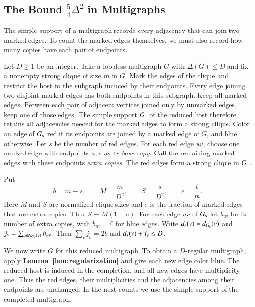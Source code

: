 

\subsection{The Bound \texorpdfstring{$\frac{5}{4}\Delta^2$}{5 Delta squared / 4} in Multigraphs}
\label{sec:multigraph}\label{sec:weighted-counts}

The simple support of a multigraph records every adjacency that can
join two marked edges. To count the marked edges themselves, we must
also record how many copies have each pair of endpoints.

Let $D\geq1$ be an integer. Take a loopless multigraph $G$ with
$\Delta(G)\leq D$ and fix a
nonempty strong clique of size $m$ in $G$. Mark the edges of the clique
and restrict the host to the subgraph induced by their endpoints.
Every edge joining two disjoint marked edges has both endpoints in this
subgraph. Keep all marked edges. Between each pair of adjacent vertices joined
only by unmarked edges, keep one of those edges. The simple support $G_{\rm s}$ of the reduced
host therefore retains all adjacencies needed for the marked edges to
form a strong clique. Color an edge of $G_{\rm s}$ red if its endpoints are joined by a
marked edge of $G$, and blue otherwise. Let $s$ be the number of red
edges. For each red edge $uv$, choose one marked edge with endpoints
$u,v$ as its \emph{base copy}. Call the remaining marked edges with
these endpoints \emph{extra copies}. The red edges form a strong
clique in $G_{\rm s}$.

Put
\[
 b=m-s,\qquad M=\frac{m}{D^2},\qquad S=\frac{s}{D^2},
 \qquad e=\frac{b}{m}.
\]
Here $M$ and $S$ are normalized clique sizes and $e$ is the fraction
of marked edges that are extra copies. Thus $S=M(1-e)$. For each edge $uv$ of $G_{\rm s}$ let $b_{uv}$ be its
number of extra copies, with $b_{uv}=0$ for blue edges. Write
$d_{\rm s}(v)=d_{G_{\rm s}}(v)$ and
$j_v=\sum_{u\in N_{G_{\rm s}}(v)}b_{uv}$.
Then $\sum_v j_v=2b$ and $d_{\rm s}(v)+j_v\le D$.

We now write $G$ for this reduced multigraph. To obtain a
$D$-regular multigraph, apply \textbf{Lemma~\ref{lem:regularization}} and give each new edge
color blue. The reduced host is induced in the completion, and all
new edges have multiplicity one. Thus the red edges, their
multiplicities and the adjacencies among their endpoints are
unchanged. In the next counts we use the simple support of the
completed multigraph.

